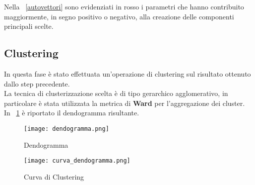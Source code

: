 Nella \figurename~\ref{autovettori} sono evidenziati in rosso i parametri che
hanno contribuito maggiormente, in segno positivo o negativo, alla creazione
delle componenti principali scelte.\\

\clearpage
\subsection{Clustering}
In questa fase è stato effettuata un'operazione di clustering sul risultato
ottenuto dallo step precedente.\\
La tecnica di clusterizzazione scelta è di tipo gerarchico agglomerativo,
in particolare è stata utilizzata la metrica di \textbf{Ward} per l'aggregazione
dei cluster.\\
In \figurename~\ref{dendogramma} è riportato il dendogramma risultante.\\

\begin{figure}[!htbp]
	\texttt{[image: dendogramma.png]}
  \caption{Dendogramma}
  \label{dendogramma}
\end{figure}
\clearpage
\begin{figure}[!htbp]
	\texttt{[image: curva\_dendogramma.png]}
  \caption{Curva di Clustering}
  \label{curva_dendogramma}
\end{figure}

